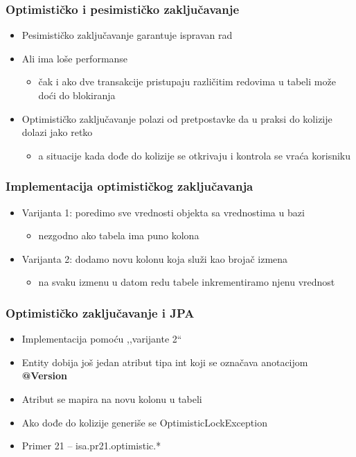 \documentclass[compress]{beamer}
\begin{document}
\begin{frame}
  \frametitle{Optimističko i pesimističko zaključavanje}
  \begin{itemize}
    \item Pesimističko zaključavanje garantuje ispravan rad
    \item Ali ima loše performanse
    \begin{itemize}
      \item čak i ako dve transakcije pristupaju različitim redovima u tabeli može doći do blokiranja
    \end{itemize}
    \item Optimističko zaključavanje polazi od pretpostavke da u praksi do kolizije dolazi jako retko
    \begin{itemize}
      \item a situacije kada dođe do kolizije se otkrivaju i kontrola se vraća korisniku
    \end{itemize}
  \end{itemize}
\end{frame}
\begin{frame}
  \frametitle{Implementacija optimističkog zaključavanja}
  \begin{itemize}
    \item Varijanta 1: poredimo sve vrednosti objekta sa vrednostima u bazi
    \begin{itemize}
      \item nezgodno ako tabela ima puno kolona
    \end{itemize}
    \item Varijanta 2: dodamo novu kolonu koja služi kao brojač izmena
    \begin{itemize}
      \item na svaku izmenu u datom redu tabele inkrementiramo njenu vrednost
    \end{itemize}
  \end{itemize}
\end{frame}
\begin{frame}
  \frametitle{Optimističko zaključavanje i JPA}
  \begin{itemize}
    \item Implementacija pomoću ,,varijante 2``
    \item Entity dobija još jedan atribut tipa int koji se označava anotacijom \textbf{@Version}
    \item Atribut se mapira na novu kolonu u tabeli
    \item Ako dođe do kolizije generiše se OptimisticLockException
    \item Primer 21 -- isa.pr21.optimistic.*
  \end{itemize}
\end{frame}
\end{document}
